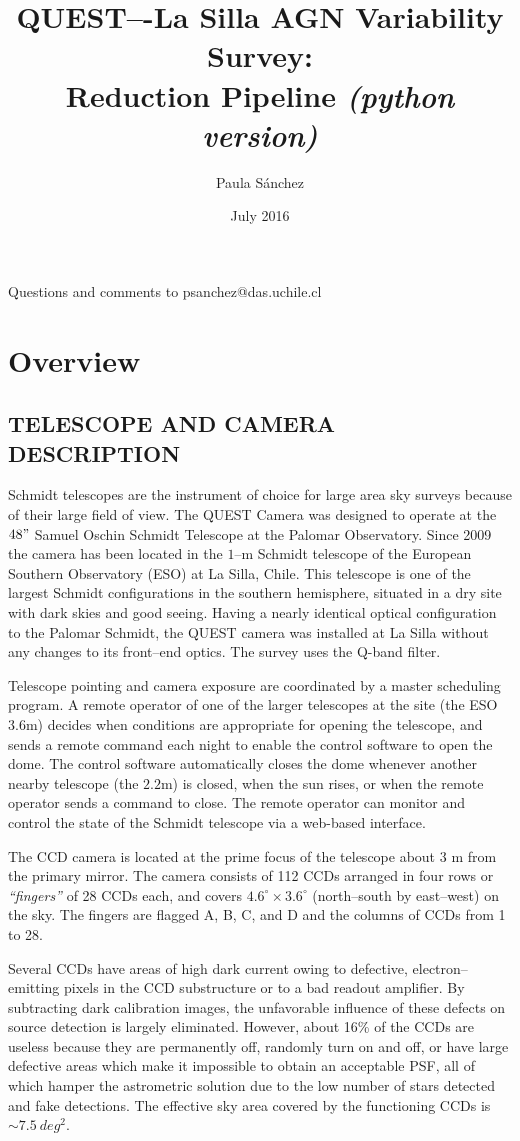 \documentclass[letter, 12pt]{article}
\title{QUEST–-La Silla AGN Variability Survey:\\
Reduction Pipeline \textit{(python version)}}
\date{July 2016}
\author{Paula S\'anchez}
\begin{document}
\maketitle


Questions and comments to psanchez@das.uchile.cl

\section{Overview}

\subsection{TELESCOPE AND CAMERA DESCRIPTION}

Schmidt telescopes are the instrument of choice for large area sky surveys because of their large field of view. 
The QUEST Camera was designed to operate at the $48"$ Samuel Oschin Schmidt Telescope at the Palomar Observatory.
Since 2009 the camera has been located in the $1$--m Schmidt telescope of the European Southern Observatory (ESO) at La Silla, Chile. This telescope is one of the largest Schmidt configurations in the southern hemisphere, situated in a dry site 
with dark skies and good seeing. Having a nearly identical optical configuration to the Palomar Schmidt, the QUEST camera was installed at La Silla without any changes to its front--end optics. The survey uses the Q-band filter.

Telescope pointing and camera exposure are coordinated by a master scheduling program. A remote operator of 
one of the larger telescopes at the site (the ESO $3.6$m) decides when conditions are appropriate for opening the telescope, and sends a remote command each night to enable the control software to open the dome. The control software automatically closes the dome whenever another nearby telescope (the $2.2$m) is closed, when the sun rises, or when the remote operator sends a command to close. The remote operator can monitor and control the state of the Schmidt telescope via a web-based interface.

The CCD camera is located at the prime focus of the telescope about $3$ m from the primary mirror. The camera consists of 112 CCDs arranged in four rows or {\it ``fingers''} of 28 CCDs each, and covers $4.6^{\circ} \times 3.6^{\circ}$ (north--south by east--west) on the sky. The fingers are flagged 
A, B, C, and D and the columns of CCDs from 1 to 28. 

Several CCDs have areas of high dark current owing to defective, electron--emitting pixels in the CCD substructure or to a bad 
readout amplifier. By subtracting dark calibration images, the unfavorable influence of these defects on source detection is 
largely eliminated. However, about 16\% of the CCDs are useless because they are permanently off, randomly turn on and off, 
or have large defective areas which make it impossible to obtain an acceptable PSF, all of which hamper the astrometric solution 
due to the low number of stars detected and fake detections. The effective sky area covered by the functioning CCDs is $\sim 7.5~ deg^{2}$.
\end{document}
